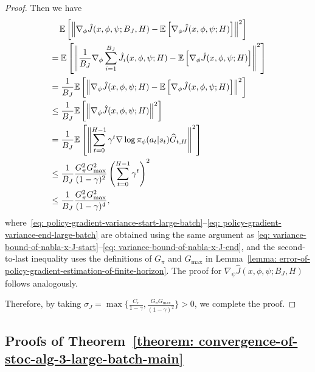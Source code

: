 \documentclass{article}
\theoremstyle{plain}
\theoremstyle{definition}
\theoremstyle{remark}
\def\E{\mathbb E}
\begin{document}
\begin{proof}
    Then we have
    \begin{align}
        & \quad \,\E \left[ \left\| \nabla_\phi \hat{J}(x,\phi,\psi;B_J,H) - \E \left[ \nabla_\phi \hat{J}(x,\phi,\psi;H) \right]\right\|^2 \right] \notag \\
        & = \E \left[ \left\| \frac{1}{B_J} \nabla_\phi \sum_{i=1}^{B_J} \hat{J}_i(x,\phi,\psi;H) - \E \left[ \nabla_\phi \hat{J}(x,\phi,\psi;H) \right] \right\|^2 \right] \label{eq: policy-gradient-variance-start-large-batch}\\
        & = \frac{1}{B_J} \E \left[ \left\| \nabla_\phi \hat{J}(x,\phi,\psi;H)    - \E \left[ \nabla_\phi \hat{J}(x,\phi,\psi;H) \right] \right\|^2 \right] \\
        & \leq \frac{1 }{B_J} \E \left[ \left\| \nabla_\phi \hat{J}(x,\phi,\psi;H)  \right\|^2 \right] \label{eq: policy-gradient-variance-end-large-batch}\\
        & = \frac{1}{B_J}  \E \left[ \left\| \sum_{t=0}^{H-1} \gamma^t \nabla \log \pi_\phi(a_t|s_t) \widehat{G}_{t,H}  \right\|^2 \right] \\
        & \leq \frac{1}{B_J} \frac{G_\pi^2 G_{\max}^2}{(1-\gamma)^2} \left( \sum_{t=0}^{H-1} \gamma^{t} \right)^2\\
        & \leq \frac{1}{B_J} \frac{G_\pi^2 G_{\max}^2}{(1-\gamma)^4},
    \end{align}
   where~\eqref{eq: policy-gradient-variance-start-large-batch}--\eqref{eq: policy-gradient-variance-end-large-batch}
are obtained using the same argument as
\eqref{eq: variance-bound-of-nabla-x-J-start}--\eqref{eq: variance-bound-of-nabla-x-J-end},
and the second-to-last inequality uses the definitions of $G_\pi$ and
$G_{\max}$ in Lemma~\ref{lemma: error-of-policy-gradient-estimation-of-finite-horizon}. The proof for $\nabla_\psi \hat{J}(x,\phi,\psi;B_J,H)$ follows analogously.

Therefore, by taking $\sigma_J = \max \{\frac{C_r}{1-\gamma}, \frac{ G_\pi G_{\max}}{(1-\gamma)^2} \} > 0$, we complete the proof. 
\end{proof}

\subsection{Proofs of Theorem~\ref{theorem: convergence-of-stoc-alg-3-large-batch-main}}
\end{document}
